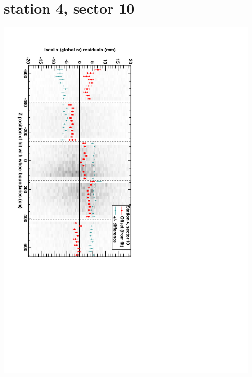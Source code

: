 \documentclass[compress]{beamer}
\begin{document}
\section*{station 4, sector 10}
\begin{frame} \vfill \mbox{\hspace{-1 cm}\includegraphics[height=1.2\linewidth, angle=90]{DTrphiVsZ_st4_sr10.pdf}} \end{frame}
\end{document}
